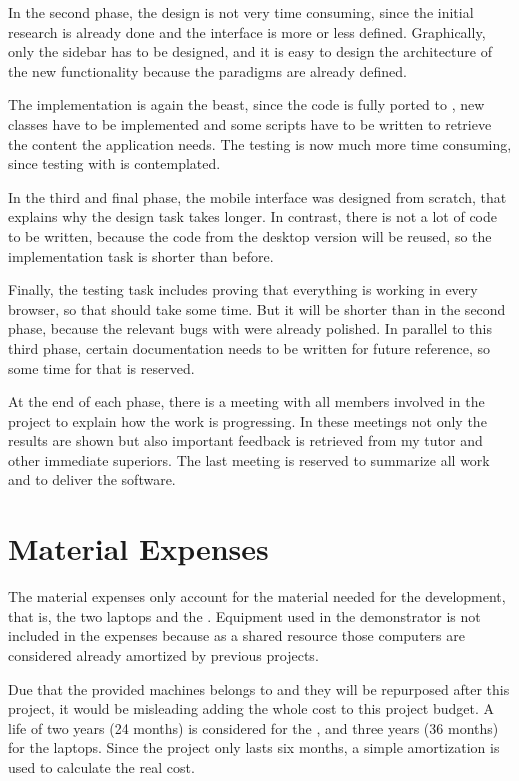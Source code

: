 In the second phase, the design is not very time consuming, since the initial research is already done and the interface is more or less defined.
Graphically, only the sidebar has to be designed, and it is easy to design the architecture of the new functionality because the paradigms are already defined.

The implementation is again the beast, since the  code is fully ported to , new classes have to be implemented and some  scripts have to be written to retrieve the content the application needs.
The testing is now much more time consuming, since testing with  is contemplated.

In the third and final phase, the mobile interface was designed from scratch, that explains why the design task takes longer.
In contrast, there is not a lot of code to be written, because the code from the desktop version will be reused, so the implementation task is shorter than before.

Finally, the testing task includes proving that everything is working in every browser, so that should take some time.
But it will be shorter than in the second phase, because the relevant bugs with  were already polished.
In parallel to this third phase, certain documentation needs to be written for future reference, so some time for that is reserved.

At the end of each phase, there is a meeting with all members involved in the project to explain how the work is progressing.
In these meetings not only the results are shown but also important feedback is retrieved from my tutor and other  immediate superiors.
The last meeting is reserved to summarize all work and to deliver the software.
\nicesectionending

\section{Material Expenses} %
\label{sec:material_expenses}

The material expenses only account for the material needed for the development, that is, the two laptops and the .
Equipment used in the demonstrator is not included in the expenses because as a shared resource those computers are considered already amortized by previous projects.

Due that the provided machines belongs to  and they will be repurposed after this project, it would be misleading adding the whole cost to this project budget.
A life of two years (24 months) is considered for the , and three years (36 months) for the laptops.
Since the project only lasts six months, a simple amortization is used to calculate the real cost.

